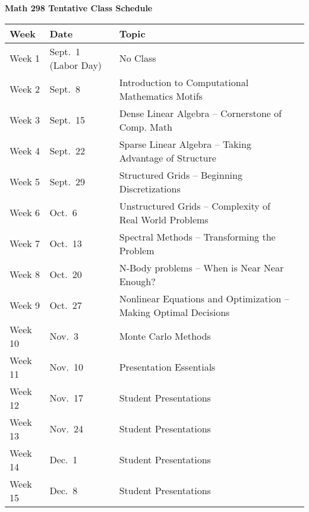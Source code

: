\documentclass[11pt]{article}
\begin{document}
\begin{center}

{\bf Math 298 Tentative Class Schedule}

\bigskip

\begin{tabular}{|l|l|l|l|}

  \hline

  {\bf Week} & {\bf Date} & {\bf Topic}\\

  \hline \hline

  Week 1 & Sept.~1 (Labor Day)  & No Class \\
  \hline

  Week 2 & Sept.~8  & Introduction to Computational Mathematics Motifs\\
  \hline

  Week 3 & Sept.~15  & Dense Linear Algebra -- Cornerstone of Comp. Math \\
  \hline

  Week 4 & Sept.~22  & Sparse Linear Algebra -- Taking Advantage of Structure \\
  \hline

  Week 5 & Sept.~29  & Structured Grids -- Beginning Discretizations \\
  \hline

  Week 6 & Oct.~6    & Unstructured Grids -- Complexity of Real World Problems \\
  \hline

  Week 7 & Oct.~13   & Spectral Methods  -- Transforming the Problem \\
  \hline

  Week 8 & Oct.~20   & N-Body problems -- When is Near Near Enough? \\
  \hline

  Week 9 & Oct.~27   & Nonlinear Equations and Optimization -- Making Optimal Decisions \\
  \hline

  Week 10 & Nov.~3    & Monte Carlo Methods\\
  \hline

  Week 11 & Nov.~10 & Presentation Essentials \\
  \hline

  Week 12 & Nov.~17   & Student Presentations\\
  \hline

  Week 13 & Nov.~24   & Student Presentations\\
  \hline

  Week 14 & Dec.~1   & Student Presentations\\
  \hline

  Week 15 & Dec.~8    & Student Presentations\\
  \hline
  
\end{tabular}

\end{center}

\
\end{document}
